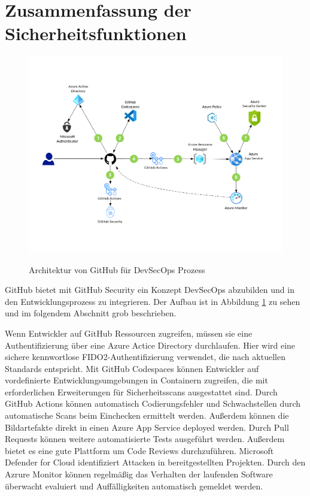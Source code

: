 \section{Zusammenfassung der Sicherheitsfunktionen}
\begin{figure}[H]
	{\caption{Architektur von GitHub für DevSecOps Prozess}
		\label{FIG:devsecops-in-github}}
	{\includegraphics[width=1\textwidth]{figures/devsecops-in-github.png}}
\end{figure}
GitHub bietet mit GitHub Security ein Konzept DevSecOps abzubilden und in den Entwicklungsprozess zu integrieren. Der Aufbau ist in Abbildung \ref{FIG:devsecops-in-github} zu sehen und im folgendem Abschnitt grob beschrieben.

Wenn Entwickler auf GitHub Ressourcen zugreifen, müssen sie eine Authentifizierung über eine Azure Actice Directory durchlaufen. Hier wird eine sichere kennwortlose  FIDO2-Authentifizierung verwendet, die nach aktuellen Standards entspricht. \cite{mic-fido2}
Mit GitHub Codespaces können Entwickler auf vordefinierte Entwicklungsumgebungen in Containern zugreifen, die mit erforderlichen Erweiterungen für Sicherheitsscans ausgestattet sind.
Durch GitHub Actions können automatisch Codierungsfehler und Schwachstellen durch automatische Scans beim Einchecken ermittelt werden.
Außerdem können die Bildartefakte direkt in einen Azure App Service deployed werden.
Durch Pull Requests können weitere automatisierte Tests ausgeführt werden. Außerdem bietet es eine gute Plattform um Code Reviews durchzuführen.
Microsoft Defender for Cloud identifiziert Attacken in bereitgestellten Projekten.
Durch den Azrure Monitor können regelmäßig das Verhalten der laufenden Software überwacht evaluiert und Auffälligkeiten automatisch gemeldet werden.\cite{mic-devsecops-github}

